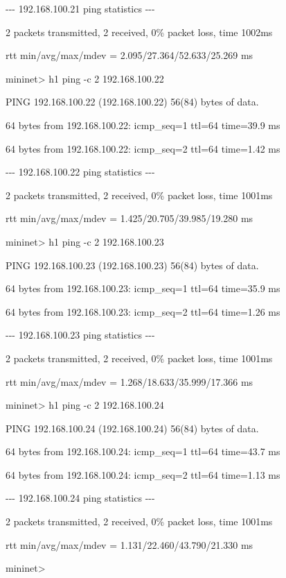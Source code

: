 \bigskip

{}-{}-{}- 192.168.100.21 ping statistics -{}-{}-

2 packets transmitted, 2 received, 0\% packet loss, time 1002ms

rtt min/avg/max/mdev = 2.095/27.364/52.633/25.269 ms

mininet{\textgreater} h1 ping -c 2 192.168.100.22

PING 192.168.100.22 (192.168.100.22) 56(84) bytes of data.

64 bytes from 192.168.100.22: icmp\_seq=1 ttl=64 time=39.9 ms

64 bytes from 192.168.100.22: icmp\_seq=2 ttl=64 time=1.42 ms


\bigskip

{}-{}-{}- 192.168.100.22 ping statistics -{}-{}-

2 packets transmitted, 2 received, 0\% packet loss, time 1001ms

rtt min/avg/max/mdev = 1.425/20.705/39.985/19.280 ms

mininet{\textgreater} h1 ping -c 2 192.168.100.23

PING 192.168.100.23 (192.168.100.23) 56(84) bytes of data.

64 bytes from 192.168.100.23: icmp\_seq=1 ttl=64 time=35.9 ms

64 bytes from 192.168.100.23: icmp\_seq=2 ttl=64 time=1.26 ms


\bigskip

{}-{}-{}- 192.168.100.23 ping statistics -{}-{}-

2 packets transmitted, 2 received, 0\% packet loss, time 1001ms

rtt min/avg/max/mdev = 1.268/18.633/35.999/17.366 ms

mininet{\textgreater} h1 ping -c 2 192.168.100.24

PING 192.168.100.24 (192.168.100.24) 56(84) bytes of data.

64 bytes from 192.168.100.24: icmp\_seq=1 ttl=64 time=43.7 ms

64 bytes from 192.168.100.24: icmp\_seq=2 ttl=64 time=1.13 ms


\bigskip

{}-{}-{}- 192.168.100.24 ping statistics -{}-{}-

2 packets transmitted, 2 received, 0\% packet loss, time 1001ms

rtt min/avg/max/mdev = 1.131/22.460/43.790/21.330 ms

mininet{\textgreater}
